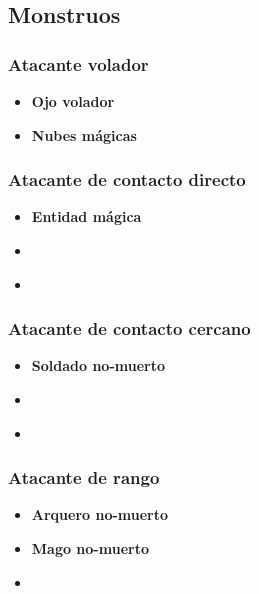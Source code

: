 \subsection{Monstruos}


\subsubsection{Atacante volador}
\begin{itemize}
    \item \textbf{Ojo volador}
    \item \textbf{Nubes mágicas}
\end{itemize}


\subsubsection{Atacante de contacto directo}
\begin{itemize}
    \item \textbf{Entidad mágica}
    \item \textbf{}
    \item \textbf{}
\end{itemize}


\subsubsection{Atacante de contacto cercano}
\begin{itemize}
    \item \textbf{Soldado no-muerto}
    \item \textbf{}
    \item \textbf{}
\end{itemize}

\subsubsection{Atacante de rango}
\begin{itemize}
    \item \textbf{Arquero no-muerto}
    \item \textbf{Mago no-muerto}
    \item \textbf{}
\end{itemize}



